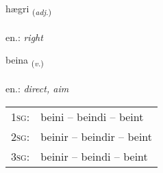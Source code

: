 \documentclass[frontgrid, backgrid]{flacards}\usepackage[]{graphicx}\usepackage[]{xcolor}
\begin{document}
\renewcommand{\flhead}{\vskip5pt \fboxsep=0pt {\small\bfseries\footnotesize Lýsingarorð | Adjective}}
\renewcommand{\fcfoot}{\vskip5pt \fboxsep=0pt \hspace{2pt}{\small\bfseries\footnotesize 2K}}

\renewcommand{\blhead}{\vskip5pt {\small\bfseries\footnotesize Lýsingarorð | Adjective }}
\renewcommand{\bcfoot}{\vskip5pt \hspace{2pt}{\small\bfseries\footnotesize 2K}}


{hægri \small{\textsubscript{(\textit{adj.})}} \\[1ex] %
\textphonetic{[haiɣrɪ]} \\
en.: \emph{right} \\  [2ex]
\renewcommand*{\arraystretch}{0.8}
}

\renewcommand{\flhead}{\vskip5pt \fboxsep=0pt {\small\bfseries\footnotesize Sagnorð | Verb}}
\renewcommand{\fcfoot}{\vskip5pt \fboxsep=0pt \hspace{2pt}{\small\bfseries\footnotesize 2K}}

\renewcommand{\blhead}{\vskip5pt {\small\bfseries\footnotesize Sagnorð | Verb }}
\renewcommand{\bcfoot}{\vskip5pt \hspace{2pt}{\small\bfseries\footnotesize 2K}}


{beina \small{\textsubscript{(\textit{v.})}} \\[1ex] %
\textphonetic{[peiːna]} \\
en.: \emph{direct, aim} \\  [2ex]
\renewcommand*{\arraystretch}{0.8}
\begin{tabular}{p{1cm}l}
\textsc{1sg}: & beini -- beindi -- beint \\ 
\textsc{2sg}: & beinir -- beindir -- beint \\ 
\textsc{3sg}: & beinir -- beindi -- beint \\ 
\end{tabular}
}
\end{document}
